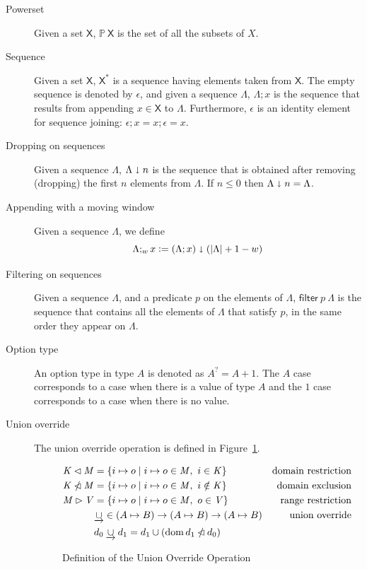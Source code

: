 \documentclass[11pt,a4paper]{article}
\DeclareMathOperator{\dom}{dom}
\newcommand{\powerset}[1]{\mathbb{P}~#1}
\newcommand{\restrictdom}{\lhd}
\newcommand{\subtractdom}{\mathbin{\slashed{\restrictdom}}}
\newcommand{\restrictrange}{\rhd}
\newcommand{\unionoverride}{\mathbin{\underrightarrow\cup}}
\newcommand{\var}[1]{\mathit{#1}}
\newcommand{\fun}[1]{\mathsf{#1}}
\newcommand{\type}[1]{\mathsf{#1}}
\newcommand{\size}[1]{\left| #1 \right|}
\newcommand{\seqof}[1]{#1^{*}}
\newcommand{\leteq}{\ensuremath{\mathrel{\mathop:}=}}
\begin{document}
\begin{description}
\item[Powerset] Given a set $\type{X}$, $\powerset{\type{X}}$ is the set of all
  the subsets of $X$.
\item[Sequence] Given a set $\type{X}$, $\seqof{\type{X}}$ is a sequence
  having elements taken from $\type{X}$.
  The empty sequence is denoted by $\epsilon$, and given a sequence $\Lambda$,
  $\Lambda; x$ is the sequence that results from appending
  $x \in \type{X}$ to $\Lambda$.
  Furthermore, $\epsilon$ is an identity element for sequence joining:
  $\epsilon; x = x; \epsilon = x$.
\item[Dropping on sequences] Given a sequence $\Lambda$,
  $\Lambda \shortdownarrow n$ is the sequence that is obtained after removing
  (dropping) the first $n$ elements from $\Lambda$. If $n \leq 0$ then
  $\Lambda \shortdownarrow n = \Lambda$.
\item[Appending with a moving window] Given a sequence $\Lambda$, we define
  $$\Lambda ;_w x \leteq (\Lambda; x) \shortdownarrow (\size{\Lambda} + 1 - w)$$
\item[Filtering on sequences] Given a sequence $\Lambda$, and a predicate $p$
  on the elements of $\Lambda$, $\fun{filter}~p~\Lambda$ is the sequence that
  contains all the elements of $\Lambda$ that satisfy $p$, in the same order
  they appear on $\Lambda$.
\item[Option type] An option type in type $A$ is denoted as $A^? = A + 1$. The
  $A$ case corresponds to a case when there is a value of type $A$ and the $1$
  case corresponds to a case when there is no value.
\item[Union override] The union override operation is defined in
  Figure~\ref{fig:unionoverride}.
  \begin{figure}
    \begin{align*}
      \var{K} \restrictdom \var{M}
      & = \{ i \mapsto o \mid i \mapsto o \in \var{M}, ~ i \in \var{K} \}
      & \text{domain restriction}
      \\
      \var{K} \subtractdom \var{M}
      & = \{ i \mapsto o \mid i \mapsto o \in \var{M}, ~ i \notin \var{K} \}
      & \text{domain exclusion}
      \\
      \var{M} \restrictrange \var{V}
      & = \{ i \mapsto o \mid i \mapsto o \in \var{M}, ~ o \in \var{V} \}
      & \text{range restriction}
      \\
      & \unionoverride \in (A \mapsto B) \to (A \mapsto B) \to (A \mapsto B)
      & \text{union override}\\
      & d_0 \unionoverride d_1 = d_1 \cup (\dom d_1 \subtractdom d_0)
    \end{align*}
    \caption{Definition of the Union Override Operation}
    \label{fig:unionoverride}
  \end{figure}
\end{description}
\end{document}
